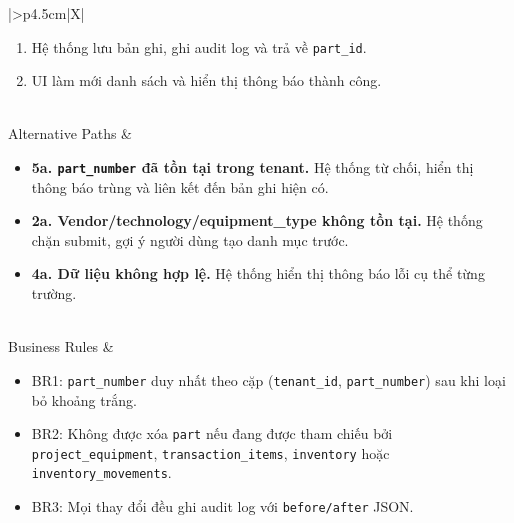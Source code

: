 \begin{xltabular}{\textwidth}{|>{\bfseries}p{4.5cm}|X|}
\begin{enumerate}[leftmargin=*, nosep]
        \item Hệ thống lưu bản ghi, ghi audit log và trả về \texttt{part\_id}.
        \item UI làm mới danh sách và hiển thị thông báo thành công.
    \end{enumerate} \\
    \hline
    Alternative Paths &
    \begin{itemize}[leftmargin=*, nosep]
        \item \textbf{5a. \texttt{part\_number} đã tồn tại trong tenant.} Hệ thống từ chối, hiển thị thông báo trùng và liên kết đến bản ghi hiện có.
        \item \textbf{2a. Vendor/technology/equipment\_type không tồn tại.} Hệ thống chặn submit, gợi ý người dùng tạo danh mục trước.
        \item \textbf{4a. Dữ liệu không hợp lệ.} Hệ thống hiển thị thông báo lỗi cụ thể từng trường.
    \end{itemize} \\
    \hline
    Business Rules &
    \begin{itemize}[leftmargin=*, nosep]
        \item BR1: \texttt{part\_number} duy nhất theo cặp (\texttt{tenant\_id}, \texttt{part\_number}) sau khi loại bỏ khoảng trắng.
        \item BR2: Không được xóa \texttt{part} nếu đang được tham chiếu bởi \texttt{project\_equipment}, \texttt{transaction\_items}, \texttt{inventory} hoặc \texttt{inventory\_movements}.
        \item BR3: Mọi thay đổi đều ghi audit log với \texttt{before/after} JSON.
    \end{itemize} \\
    \hline
    \caption{Đặc tả Use Case: Quản lý phụ tùng} \\
\end{xltabular}

